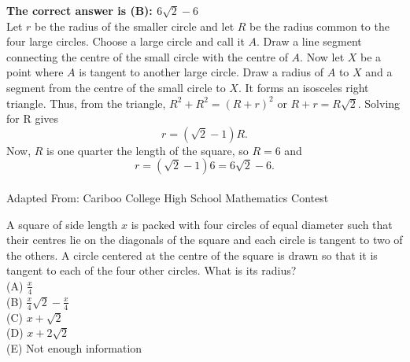 \documentclass{article}
\begin{document}

\textbf{The correct answer is (B): $6\sqrt{2}-6$}\\[1 ex]
Let $r$ be the radius of the smaller circle and let $R$ be the radius common to the four large circles. Choose a large circle and call it $A$. Draw a line segment connecting the centre of the small circle with the centre of $A$. Now let $X$ be a point where $A$ is tangent to another large circle. Draw a radius of $A$ to $X$ and a segment from the centre of the small circle to $X$. It forms an isosceles right triangle. Thus, from the triangle, $R^{2}+R^{2}=(R+r)^2$ or $R+r=R\sqrt{2}$.  Solving for R gives
\begin{equation*}
r=(\sqrt{2}-1)R.
\end{equation*}
Now, $R$ is one quarter the length of the square, so $R=6$ and 
\begin{equation*}
r=(\sqrt{2}-1)6=6\sqrt{2}-6.
\end{equation*}
\\[5 ex]

\scriptsize
Adapted From: Cariboo College High School Mathematics Contest

\normalsize
A square of side length $x$ is packed with four circles of equal diameter such that their centres lie on the diagonals of the square and each circle is tangent to two of the others. A circle centered at the centre of the square is drawn so that it is tangent to each of the four other circles. What is its radius?\\
(A) $\frac{x}{4}$\\
(B) $\frac{x}{4}\sqrt{2}-\frac{x}{4}$\\
(C) $x+\sqrt{2}$\\
(D) $x+2\sqrt{2}$\\
(E) Not enough information\\

\end{document}
